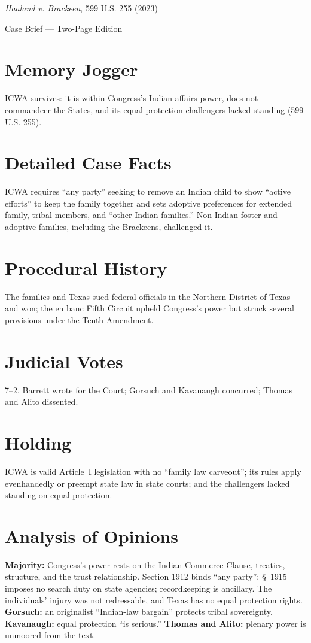 \documentclass[12pt]{article}
\begin{document}
\begin{center}
{\LARGE \textit{Haaland v. Brackeen}, 599 U.S. 255 (2023)\par}
\vspace{0.5em}
{\large Case Brief --- Two-Page Edition\par}
\end{center}

\section{Memory Jogger}
ICWA survives: it is within Congress's Indian-affairs power, does not commandeer the States, and its equal protection challengers lacked standing (\href{https://supreme.justia.com/cases/federal/us/599/21-376/}{599 U.S. 255}).

\section{Detailed Case Facts}
ICWA requires ``any party'' seeking to remove an Indian child to show ``active efforts'' to keep the family together and sets adoptive preferences for extended family, tribal members, and ``other Indian families.'' Non-Indian foster and adoptive families, including the Brackeens, challenged it.

\section{Procedural History}
The families and Texas sued federal officials in the Northern District of Texas and won; the en banc Fifth Circuit upheld Congress's power but struck several provisions under the Tenth Amendment.

\section{Judicial Votes}
7--2. Barrett wrote for the Court; Gorsuch and Kavanaugh concurred; Thomas and Alito dissented.

\section{Holding}
ICWA is valid Article~I legislation with no ``family law carveout''; its rules apply evenhandedly or preempt state law in state courts; and the challengers lacked standing on equal protection.

\section{Analysis of Opinions}
\textbf{Majority:} Congress's power rests on the Indian Commerce Clause, treaties, structure, and the trust relationship. Section 1912 binds ``any party''; \S~1915 imposes no search duty on state agencies; recordkeeping is ancillary. The individuals' injury was not redressable, and Texas has no equal protection rights. \textbf{Gorsuch:} an originalist ``Indian-law bargain'' protects tribal sovereignty. \textbf{Kavanaugh:} equal protection ``is serious.'' \textbf{Thomas and Alito:} plenary power is unmoored from the text.
\end{document}
